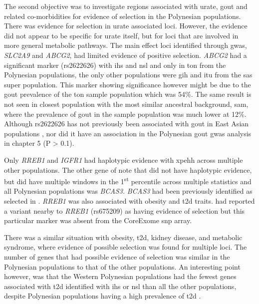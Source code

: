 \documentclass[twoside,openright]{report}
\begin{document}
The second objective was to investigate regions associated with urate,
gout and related co-morbidities for evidence of selection in the
Polynesian populations. There was evidence for selection in urate
associated loci. However, the evidence did not appear to be specific for
urate itself, but for loci that are involved in more general metabolic
pathways. The main effect loci identified through \gls{gwas},
\emph{SLC2A9} and \emph{ABCG2}, had limited evidence of positive
selection. \emph{ABCG2} had a significant marker (rs2622626) with
\gls{ihs} and \gls{nsl} and only in \gls{ton} from the Polynesian
populations, the only other populations were \gls{gih} and \gls{itu}
from the \gls{sas} super population. This marker showing significance
however might be due to the gout prevalence of the \gls{ton} sample
population which was 54\%. The same result is not seen in closest
population with the most similar ancestral background, \gls{sam}, where
the prevalence of gout in the sample population was much lower at 12\%.
Although rs2622626 has not previously been associated with gout in East
Asian populations \citep{zhang2016associations}, nor did it have an
association in the Polynesian gout \gls{gwas} analysis in chapter 5 (P
\textgreater{} 0.1).

Only \emph{RREB1} and \emph{IGFR1} had haplotypic evidence with
\gls{xpehh} across multiple other populations. The other gene of note
that did not have haplotypic evidence, but did have multiple windows in
the 1\textsuperscript{st} percentile across multiple statistics and all
Polynesian populations was \emph{BCAS3.} \emph{BCAS3} had been
previously identified as selected in \citet{Grossman2013}. \emph{RREB1}
was also associated with obesity and \gls{t2d} traits.
\citet{Zhang2013a} had reported a variant nearby to \emph{RREB1}
(rs675209) as having evidence of selection but this particular marker
was absent from the CoreExome \gls{snp} array.

There was a similar situation with obesity, \gls{t2d}, kidney disease,
and metabolic syndrome, where evidence of possible selection was found
for multiple loci. The number of genes that had possible evidence of
selection was similar in the Polynesian populations to that of the other
populations. An interesting point however, was that the Western
Polynesian populations had the fewest genes associated with \gls{t2d}
identified with \gls{ihs} or \gls{nsl} than all the other populations,
despite Polynesian populations having a high prevalence of \gls{t2d}
\citep{Winnard2013}.
\end{document}
